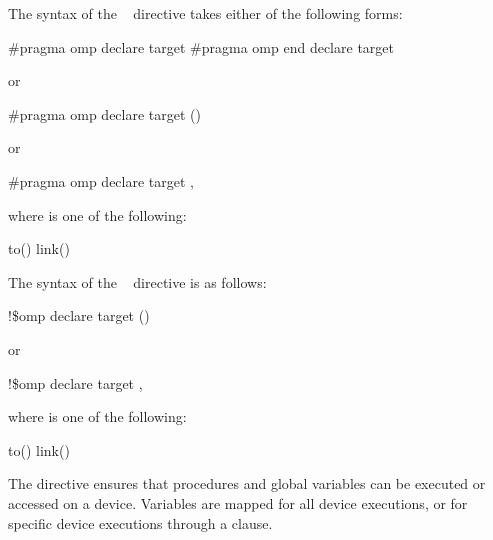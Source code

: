 {{{{\syntax
\ccppspecificstart
The syntax of the ~ directive takes either of 
the following forms:

\begin{boxedcode}
\#pragma omp declare target 
\#pragma omp end declare target 
\end{boxedcode}

or

\begin{boxedcode}
\#pragma omp declare target () 
\end{boxedcode}

or

\begin{boxedcode}
\#pragma omp declare target \plc{clause[ [},\plc{] clause ... ] new-line}
\end{boxedcode}

where  is one of the following:

\begin{indentedcodelist}
to()
link()
\end{indentedcodelist}
\ccppspecificend

\begin{samepage}

\fortranspecificstart
The syntax of the ~ directive is as follows:

\begin{boxedcode}
!\$omp declare target ()
\end{boxedcode}

or

\begin{boxedcode}
!\$omp declare target \plc{[clause[ [},\plc{] clause] ... ]} 
\end{boxedcode}

where  is one of the following:

\begin{indentedcodelist}
to()
link()
\end{indentedcodelist}
\fortranspecificend

\descr

The   directive ensures that procedures
and global variables can be executed or accessed on a device.
Variables are mapped for all device executions, or for specific
device executions through a  clause.


\end{samepage}}}}}
